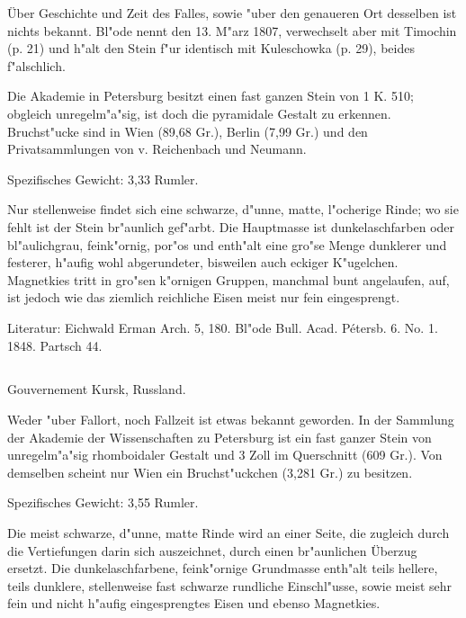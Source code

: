 \documentclass[a4paper, 11pt, oneside]{article}
\begin{document}
Über Geschichte und Zeit des Falles, sowie "uber den genaueren Ort desselben ist nichts bekannt. Bl"ode nennt den 13. M"arz 1807, verwechselt aber mit Timochin (p. 21) und h"alt den Stein f"ur identisch mit Kuleschowka (p. 29), beides f"alschlich.

Die Akademie in Petersburg besitzt einen fast ganzen Stein von 1 K. 510; obgleich unregelm"a"sig, ist doch die pyramidale Gestalt zu erkennen. Bruchst"ucke sind in Wien (89,68 Gr.), Berlin (7,99 Gr.) und den Privatsammlungen von v. Reichenbach und Neumann.

Spezifisches Gewicht: 3,33 Rumler.

Nur stellenweise findet sich eine schwarze, d"unne, matte, l"ocherige Rinde; wo sie fehlt ist der Stein br"aunlich gef"arbt. Die Hauptmasse ist dunkelaschfarben oder bl"aulichgrau, feink"ornig, por"os und enth"alt eine gro"se Menge dunklerer und festerer, h"aufig wohl abgerundeter, bisweilen auch eckiger K"ugelchen. Magnetkies tritt in gro"sen k"ornigen Gruppen, manchmal bunt angelaufen, auf, ist jedoch wie das ziemlich reichliche Eisen meist nur fein eingesprengt.

\normalsize
Literatur: Eichwald Erman Arch. 5, 180. Bl"ode Bull. Acad. Pétersb. 6. No. 1. 1848. Partsch 44.

\subsection{}
\LARGE
\paragraph{}
Gouvernement Kursk, Russland.

Weder "uber Fallort, noch Fallzeit ist etwas bekannt geworden. In der Sammlung der Akademie der Wissenschaften zu Petersburg ist ein fast ganzer Stein von unregelm"a"sig rhomboidaler Gestalt und 3 Zoll im Querschnitt (609 Gr.). Von demselben scheint nur Wien ein Bruchst"uckchen (3,281 Gr.) zu besitzen.

Spezifisches Gewicht: 3,55 Rumler.

Die meist schwarze, d"unne, matte Rinde wird an einer Seite, die zugleich durch die Vertiefungen darin sich auszeichnet, durch einen br"aunlichen Überzug ersetzt. Die dunkelaschfarbene, feink"ornige Grundmasse enth"alt teils hellere, teils dunklere, stellenweise fast schwarze rundliche Einschl"usse, sowie meist sehr fein und nicht h"aufig eingesprengtes Eisen und ebenso Magnetkies.
\end{document}
